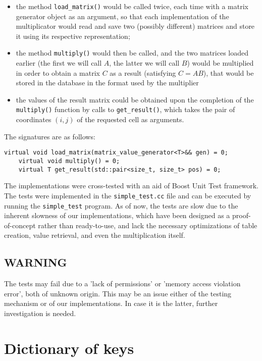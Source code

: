 \documentclass{article}
\begin{document}
\begin{itemize}
\item the method \texttt{load\_matrix()} would be called twice, each time with a matrix generator object as an argument, so that each implementation of the multiplicator would read and save two (possibly different) matrices and store it using its respective representation;
\item the method \texttt{multiply()} would then be called, and the two matrices loaded earlier (the first we will call $A$, the latter we will call $B$) would be multiplied in order to obtain a matrix $C$ as a result (satisfying $C = AB$), that would be stored in the database in the format used by the multiplier
\item the values of the result matrix could be obtained upon the completion of the \texttt{multiply()} function by calls to \texttt{get\_result()}, which takes the pair of coordinates $(i, j)$ of the requested cell as arguments.
\end{itemize}

The signatures are as follows:

\begin{lstlisting}[style=CStyle]
    virtual void load_matrix(matrix_value_generator<T>&& gen) = 0;
    virtual void multiply() = 0;
    virtual T get_result(std::pair<size_t, size_t> pos) = 0;
\end{lstlisting}

The implementations were cross-tested with an aid of Boost Unit Test framework. The tests were implemented in the \texttt{simple\_test.cc} file and can be executed by running the \texttt{simple\_test} program. As of now, the tests are slow due to the inherent slowness of our implementations, which have been designed as a proof-of-concept rather than ready-to-use, and lack the necessary optimizations of table creation, value retrieval, and even the multiplication itself.

\subsection*{WARNING}
The tests may fail due to a 'lack of permissions' or 'memory access violation error', both of unknown origin. This may be an issue either of the testing mechanism or of our implementations. In case it is the latter, further investigation is needed.

\pagebreak
\section{Dictionary of keys}
\end{document}
